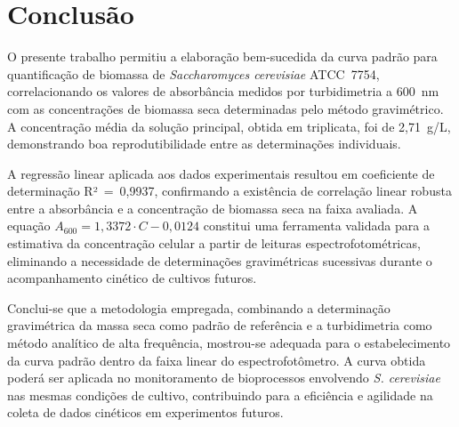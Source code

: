 \section{Conclusão}

O presente trabalho permitiu a elaboração bem-sucedida da curva padrão para quantificação de biomassa de \textit{Saccharomyces cerevisiae} ATCC~7754, correlacionando os valores de absorbância medidos por turbidimetria a 600~nm com as concentrações de biomassa seca determinadas pelo método gravimétrico. A concentração média da solução principal, obtida em triplicata, foi de 2,71~g/L, demonstrando boa reprodutibilidade entre as determinações individuais.

A regressão linear aplicada aos dados experimentais resultou em coeficiente de
determinação R²~=~0,9937, confirmando a existência de correlação linear robusta
entre a absorbância e a concentração de biomassa seca na faixa avaliada. A equação
$A_{600} = 1{,}3372 \cdot C - 0{,}0124$ constitui uma ferramenta validada para a
estimativa da concentração celular a partir de leituras espectrofotométricas,
eliminando a necessidade de determinações gravimétricas sucessivas durante o
acompanhamento cinético de cultivos futuros.

Conclui-se que a metodologia empregada, combinando a determinação gravimétrica da massa seca como padrão de referência e a turbidimetria como método analítico de alta frequência, mostrou-se adequada para o estabelecimento da curva padrão dentro da faixa linear do espectrofotômetro. A curva obtida poderá ser aplicada no monitoramento de bioprocessos envolvendo \textit{S. cerevisiae} nas mesmas condições de cultivo, contribuindo para a eficiência e agilidade na coleta de dados cinéticos em experimentos futuros.